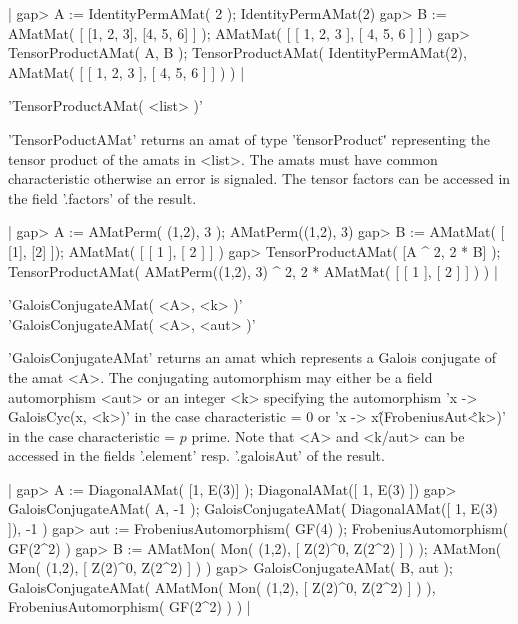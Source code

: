 |    gap> A := IdentityPermAMat( 2 );
    IdentityPermAMat(2)
    gap> B := AMatMat( [ [1, 2, 3], [4, 5, 6] ] );
    AMatMat(
      [ [ 1, 2, 3 ], [ 4, 5, 6 ] ]
    )
    gap> TensorProductAMat( A, B );
    TensorProductAMat(
      IdentityPermAMat(2),
      AMatMat(
        [ [ 1, 2, 3 ], [ 4, 5, 6 ] ]
      )
    ) |

'TensorProductAMat( <list> )'

'TensorPoductAMat' returns an amat of type '\"tensorProduct\"' 
representing the tensor product of the amats in <list>. 
The amats must have common characteristic otherwise an error 
is signaled. The tensor factors can be accessed in the field 
'.factors' of the result.

|    gap> A := AMatPerm( (1,2), 3 );
    AMatPerm((1,2), 3)
    gap> B := AMatMat( [ [1], [2] ]);
    AMatMat(
      [ [ 1 ], [ 2 ] ]
    )
    gap> TensorProductAMat( [A ^ 2, 2 * B] );
    TensorProductAMat(
      AMatPerm((1,2), 3) ^ 2,
      2 * AMatMat(
        [ [ 1 ], [ 2 ] ]
      )
    ) |


'GaloisConjugateAMat( <A>, <k> )'\\
'GaloisConjugateAMat( <A>, <aut> )'

'GaloisConjugateAMat' returns an amat which represents a Galois 
conjugate of the amat <A>. The 
conjugating automorphism may either be a field automorphism <aut>
or an integer <k> specifying the automorphism 'x -> GaloisCyc(x, <k>)'
in the case characteristic = 0 or 'x -> x\^(FrobeniusAut\^<k>)' 
in the case characteristic = $p$ prime.
Note that <A> and <k/aut> can be accessed in the fields '.element' resp.
'.galoisAut' of the result.

|    gap> A := DiagonalAMat( [1, E(3)] );
    DiagonalAMat([ 1, E(3) ])
    gap> GaloisConjugateAMat( A, -1 );
    GaloisConjugateAMat(
      DiagonalAMat([ 1, E(3) ]),
      -1
    )
    gap> aut := FrobeniusAutomorphism( GF(4) );
    FrobeniusAutomorphism( GF(2^2) )
    gap> B := AMatMon( Mon( (1,2), [ Z(2)^0, Z(2^2) ] ) );
    AMatMon( Mon(
      (1,2),
      [ Z(2)^0, Z(2^2) ]
    ) )
    gap> GaloisConjugateAMat( B, aut );
    GaloisConjugateAMat(
      AMatMon( Mon(
        (1,2),
        [ Z(2)^0, Z(2^2) ]
      ) ),
      FrobeniusAutomorphism( GF(2^2) )
    ) |

%

